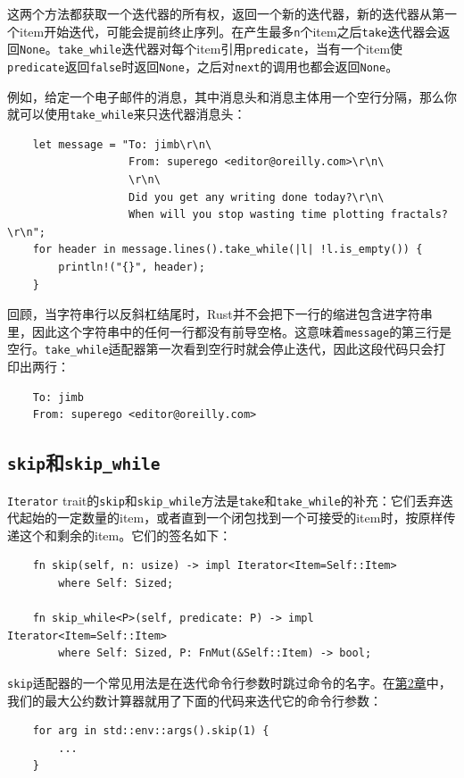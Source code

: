 这两个方法都获取一个迭代器的所有权，返回一个新的迭代器，新的迭代器从第一个item开始迭代，可能会提前终止序列。在产生最多\texttt{n}个item之后\texttt{take}迭代器会返回\texttt{None}。\texttt{take\_while}迭代器对每个item引用\texttt{predicate}，当有一个item使\texttt{predicate}返回\texttt{false}时返回\texttt{None}，之后对\texttt{next}的调用也都会返回\texttt{None}。

例如，给定一个电子邮件的消息，其中消息头和消息主体用一个空行分隔，那么你就可以使用\texttt{take\_while}来只迭代器消息头：
\begin{verbatim}
    let message = "To: jimb\r\n\
                   From: superego <editor@oreilly.com>\r\n\
                   \r\n\
                   Did you get any writing done today?\r\n\
                   When will you stop wasting time plotting fractals?\r\n";
    for header in message.lines().take_while(|l| !l.is_empty()) {
        println!("{}", header);
    }
\end{verbatim}

回顾，当字符串行以反斜杠结尾时，Rust并不会把下一行的缩进包含进字符串里，因此这个字符串中的任何一行都没有前导空格。这意味着\texttt{message}的第三行是空行。\texttt{take\_while}适配器第一次看到空行时就会停止迭代，因此这段代码只会打印出两行：
\begin{verbatim}
    To: jimb
    From: superego <editor@oreilly.com>
\end{verbatim}

\subsection{\texttt{skip}和\texttt{skip\_while}}
\texttt{Iterator} trait的\texttt{skip}和\texttt{skip\_while}方法是\texttt{take}和\texttt{take\_while}的补充：它们丢弃迭代起始的一定数量的item，或者直到一个闭包找到一个可接受的item时，按原样传递这个和剩余的item。它们的签名如下：
\begin{verbatim}
    fn skip(self, n: usize) -> impl Iterator<Item=Self::Item>
        where Self: Sized;

    fn skip_while<P>(self, predicate: P) -> impl Iterator<Item=Self::Item>
        where Self: Sized, P: FnMut(&Self::Item) -> bool;
\end{verbatim}

\texttt{skip}适配器的一个常见用法是在迭代命令行参数时跳过命令的名字。在\hyperref[ch02]{第2章}中，我们的最大公约数计算器就用了下面的代码来迭代它的命令行参数：
\begin{verbatim}
    for arg in std::env::args().skip(1) {
        ...
    }
\end{verbatim}

